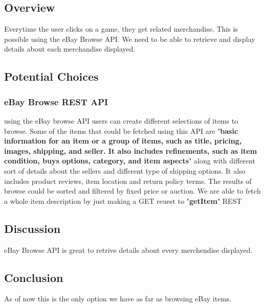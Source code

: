 \documentclass[onecolumn, draftclsnofoot,10pt, compsoc]{IEEEtran}
\begin{document}
\subsection{Overview}
Everytime the user clicks on a game, they get related merchandise. This is possible using the eBay Browse API. We need to be able to retrieve and display details about each merchandise displayed. 

\subsection{Potential Choices}
\subsubsection{eBay Browse REST API}
\par using the eBay browse API users can create different selections of items to browse. Some of the items that could be fetched using this API are "\textbf{basic information for an item or a group of items, such as title, pricing, images, shipping, and seller. It also includes refinements, such as item condition, buys options, category, and item aspects}" along with different sort of details about the sellers and different type of shipping options. It also includes product reviews, item location and return policy terms. The results of browse could be sorted and filtered by fixed price or auction. We are able to fetch a whole item description by just making a GET reuest to "\textbf{getItem}" REST
\subsection{Discussion}
eBay Browse API is great to retrive details about every merchendise displayed.
\subsection{Conclusion}
As of now this is the only option we have as far as browsing eBay items. 
\end{document}
